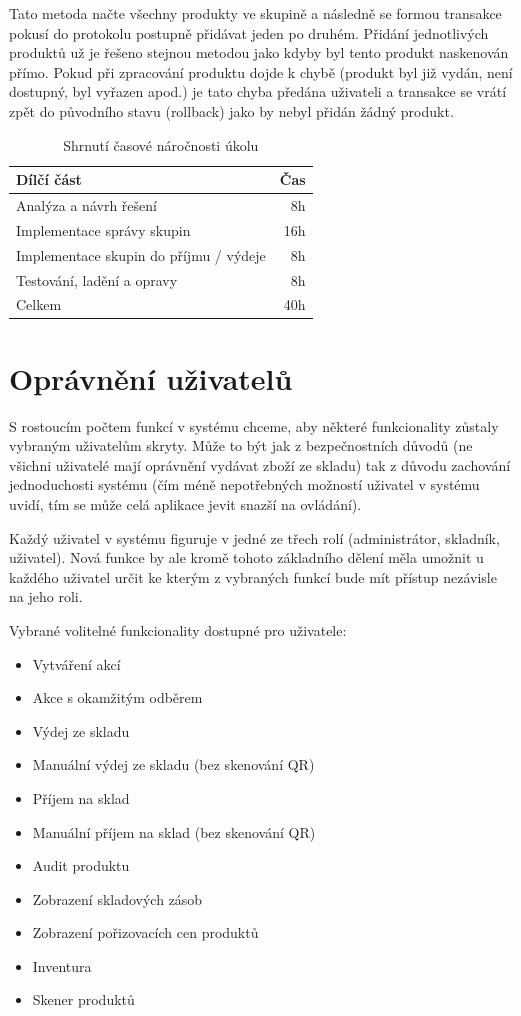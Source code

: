 Tato metoda načte všechny produkty ve skupině a následně se formou transakce pokusí do protokolu postupně přidávat jeden po druhém. Přidání jednotlivých produktů už je řešeno stejnou metodou jako kdyby byl tento produkt naskenován přímo. Pokud při zpracování produktu dojde k chybě (produkt byl již vydán, není dostupný, byl vyřazen apod.) je tato chyba předána uživateli a transakce se vrátí zpět do původního stavu (rollback) jako by nebyl přidán žádný produkt. 


\begin{table}
	\centering
	\caption[Časová náročnost úkolu na skupiny produktů]{Shrnutí časové náročnosti úkolu}
	\label{tab:TopLevelTableLabel}
	{
		\begin{tabular}{lr}
			\toprule
			Dílčí část & Čas\\
			\midrule
			Analýza a návrh řešení & 8h \\
			Implementace správy skupin & 16h \\
            Implementace skupin do příjmu / výdeje & 8h \\
            Testování, ladění a opravy & 8h \\
            \midrule
            Celkem  & 40h \\
			\midrule
		\end{tabular}
	}
\end{table}

\section{Oprávnění uživatelů}

S rostoucím počtem funkcí v systému chceme, aby některé funkcionality zůstaly vybraným uživatelům skryty. Může to být jak z bezpečnostních důvodů (ne všichni uživatelé mají oprávnění vydávat zboží ze skladu) tak z důvodu zachování jednoduchosti systému (čím méně nepotřebných možností uživatel v systému uvidí, tím se může celá aplikace jevit snazší na ovládání).

Každý uživatel v systému figuruje v jedné ze třech rolí (administrátor, skladník, uživatel). Nová funkce by ale kromě tohoto základního dělení měla umožnit u každého uživatel určit ke kterým z vybraných funkcí bude mít přístup nezávisle na jeho roli.

Vybrané volitelné funkcionality dostupné pro uživatele:
\begin{itemize}
    \item Vytváření akcí
    \item Akce s okamžitým odběrem
    \item Výdej ze skladu
    \item Manuální výdej ze skladu (bez skenování QR)
    \item Příjem na sklad
    \item Manuální příjem na sklad (bez skenování QR)
    \item Audit produktu
    \item Zobrazení skladových zásob
    \item Zobrazení pořizovacích cen produktů
    \item Inventura
    \item Skener produktů
\end{itemize}

